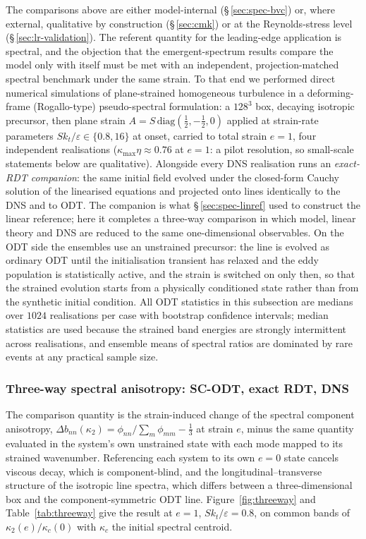 \documentclass[lineno]{JFM-FLM_Au}
\begin{document}
The comparisons above are either model-internal
(\S\,\ref{sec:spec-bvc}) or, where external, qualitative by construction
(\S\,\ref{sec:cmk}) or at the Reynolds-stress level
(\S\,\ref{sec:lr-validation}). The referent quantity for the
leading-edge application is spectral, and the objection that the
emergent-spectrum results compare the model only with itself must be met
with an independent, projection-matched spectral benchmark under the
same strain. To that end
we performed direct numerical simulations of plane-strained homogeneous
turbulence in a deforming-frame (Rogallo-type) pseudo-spectral formulation:
a $128^3$ box, decaying isotropic precursor, then plane strain
$A=S\,\mathrm{diag}(\tfrac12,-\tfrac12,0)$ applied at strain-rate
parameters $Sk_t/\varepsilon\in\{0.8,16\}$ at onset, carried to total
strain $e=1$, four independent realisations
($\kappa_{\max}\eta\approx0.76$ at $e=1$: a pilot resolution, so
small-scale statements below are qualitative). Alongside every DNS
realisation runs an \emph{exact-RDT companion}: the same initial field
evolved under the closed-form Cauchy solution of the linearised equations
and projected onto lines identically to the DNS and to ODT. The companion
is what \S\,\ref{sec:spec-linref} used to construct the linear reference;
here it completes a three-way comparison in which model, linear theory and
DNS are reduced to the same one-dimensional observables. On the ODT side
the ensembles use an unstrained precursor: the line is evolved as ordinary
ODT until the initialisation transient has relaxed and the eddy population
is statistically active, and the strain is switched on only then, so that
the strained evolution starts from a physically conditioned state rather
than from the synthetic initial condition. All ODT statistics in this
subsection are medians over $1024$ realisations per case with bootstrap
confidence intervals; median statistics are used because the strained band
energies are strongly intermittent across realisations, and ensemble means
of spectral ratios are dominated by rare events at any practical sample
size.

\subsubsection{Three-way spectral anisotropy: SC-ODT, exact RDT,
DNS}\label{sec:threeway}

The comparison quantity is the strain-induced change of the spectral
component anisotropy,
$\Delta b_{nn}(\kappa_2)=\phi_{nn}/\sum_m\phi_{mm}-\tfrac13$ at strain $e$,
minus the same quantity evaluated in the system's own unstrained state with
each mode mapped to its strained wavenumber. Referencing each system to its
own $e=0$ state cancels viscous decay, which is component-blind, and the
longitudinal--transverse structure of the isotropic line spectra, which
differs between a three-dimensional box and the component-symmetric ODT
line. Figure~\ref{fig:threeway} and Table~\ref{tab:threeway} give the
result at $e=1$, $Sk_t/\varepsilon=0.8$, on common bands of
$\kappa_2(e)/\kappa_c(0)$ with $\kappa_c$ the initial spectral centroid.
\end{document}
